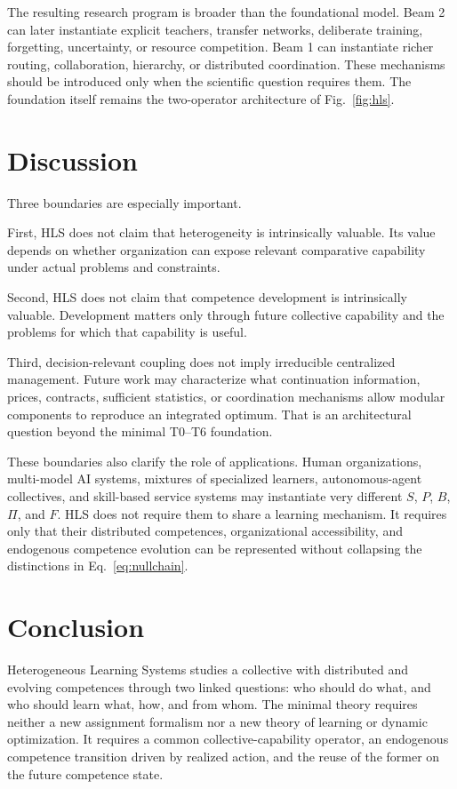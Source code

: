 \documentclass[10pt]{article}
\begin{document}
The resulting research program is broader than the foundational model. Beam 2 can later instantiate explicit teachers, transfer networks, deliberate training, forgetting, uncertainty, or resource competition. Beam 1 can instantiate richer routing, collaboration, hierarchy, or distributed coordination. These mechanisms should be introduced only when the scientific question requires them. The foundation itself remains the two-operator architecture of Fig.~\ref{fig:hls}.

\section{Discussion}

Three boundaries are especially important.

First, HLS does not claim that heterogeneity is intrinsically valuable. Its value depends on whether organization can expose relevant comparative capability under actual problems and constraints.

Second, HLS does not claim that competence development is intrinsically valuable. Development matters only through future collective capability and the problems for which that capability is useful.

Third, decision-relevant coupling does not imply irreducible centralized management. Future work may characterize what continuation information, prices, contracts, sufficient statistics, or coordination mechanisms allow modular components to reproduce an integrated optimum. That is an architectural question beyond the minimal T0--T6 foundation.

These boundaries also clarify the role of applications. Human organizations, multi-model AI systems, mixtures of specialized learners, autonomous-agent collectives, and skill-based service systems may instantiate very different $S$, $P$, $B$, $\Pi$, and $F$. HLS does not require them to share a learning mechanism. It requires only that their distributed competences, organizational accessibility, and endogenous competence evolution can be represented without collapsing the distinctions in Eq.~\eqref{eq:nullchain}.

\section{Conclusion}

Heterogeneous Learning Systems studies a collective with distributed and evolving competences through two linked questions: who should do what, and who should learn what, how, and from whom. The minimal theory requires neither a new assignment formalism nor a new theory of learning or dynamic optimization. It requires a common collective-capability operator, an endogenous competence transition driven by realized action, and the reuse of the former on the future competence state.
\end{document}
